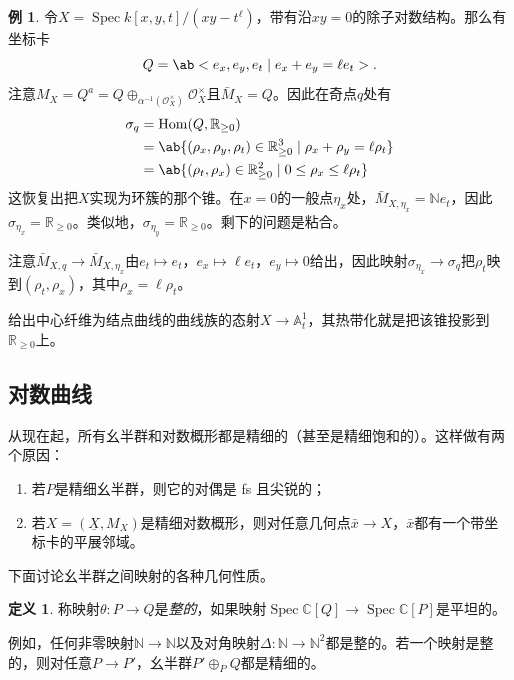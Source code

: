 \documentclass{amsart}
\theoremstyle{definition}
\newtheorem{defn}[thm]{定义}
\newtheorem{exm}[thm]{例}
\theoremstyle{remark}
\theoremstyle{plain}
\theoremstyle{definition}
\theoremstyle{remark}
\newcommand{\A}{\mathbb{A}}
\newcommand{\N}{\mathbb{N}}
\newcommand{\R}{\mathbb{R}}
\newcommand{\C}{\mathbb{C}}
\newcommand{\mc}[1]{\mathcal{#1}}
\newcommand{\ul}[1]{\underline{#1}}
\newcommand{\1}{\mathbf{1}}
\newcommand{\2}{\mathbf{2}}
\newcommand{\3}{\mathbf{3}}
\DeclareMathOperator{\Hom}{Hom}
\DeclareMathOperator{\Spec}{Spec}
\begin{document}
\begin{exm}
    令\(X = \Spec k[x,y,t]/(xy-t^{\ell})\)，带有沿\(xy = 0\)的除子对数结构。那么有坐标卡
    \[ Q = \ab<e_x, e_y, e_t \mid e_x + e_y = \ell e_t>. \]
    注意\(M_X = Q^a = Q \oplus_{\alpha^{-1}(\mc{O}_X^{\times})} \mc{O}_X^{\times}\)且\(\bar{M}_X = Q\)。因此在奇点\(q\)处有
    \begin{align*}
        \sigma_q &= \Hom(Q, \R_{\geq 0}) \\
        &= \ab\{ (\rho_x, \rho_y, \rho_t) \in \R_{\geq 0}^3 \mid \rho_x + \rho_y = \ell \rho_t \} \\
        &= \ab\{ (\rho_t, \rho_x) \in \R_{\geq 0}^2 \mid 0 \leq \rho_x \leq \ell \rho_t \}
    \end{align*}
    这恢复出把\(X\)实现为环簇的那个锥。在\(x = 0\)的一般点\(\eta_x\)处，\(\bar{M}_{X, \eta_x} = \N e_t\)，因此\(\sigma_{\eta_x} = \R_{\geq 0}\)。类似地，\(\sigma_{\eta_y} = \R_{\geq 0}\)。剩下的问题是粘合。

    注意\(\bar{M}_{X, q} \to \bar{M}_{X, \eta_x}\)由\(e_t \mapsto e_t\)，\(e_x \mapsto \ell e_t\)，\(e_y \mapsto 0\)给出，因此映射\(\sigma_{\eta_x} \to \sigma_q\)把\(\rho_t\)映到\((\rho_t, \rho_x)\)，其中\(\rho_x = \ell \rho_t\)。

    给出中心纤维为结点曲线的曲线族的态射\(X \to \A^1_t\)，其热带化就是把该锥投影到\(\R_{\geq 0}\)上。
\end{exm}


\subsection{对数曲线}%
\label{sub:Log curves}

从现在起，所有幺半群和对数概形都是精细的（甚至是精细饱和的）。这样做有两个原因：
\begin{enumerate}
    \item 若\(P\)是精细幺半群，则它的对偶是 fs 且尖锐的；
    \item 若\(X = (\ul{X}, M_X)\)是精细对数概形，则对任意几何点\(\bar{x} \to X\)，\(\bar{x}\)都有一个带坐标卡的平展邻域。
\end{enumerate}

下面讨论幺半群之间映射的各种几何性质。
\begin{defn}
    称映射\(\theta \colon P \to Q\)是\textit{整的}，如果映射\(\Spec\C[Q] \to \Spec \C[P]\)是平坦的。
\end{defn}

例如，任何非零映射\(\N \to \N\)以及对角映射\(\Delta \colon\N \to \N^2\)都是整的。若一个映射是整的，则对任意\(P \to P'\)，幺半群\(P' \oplus_P Q\)都是精细的。
\end{document}
